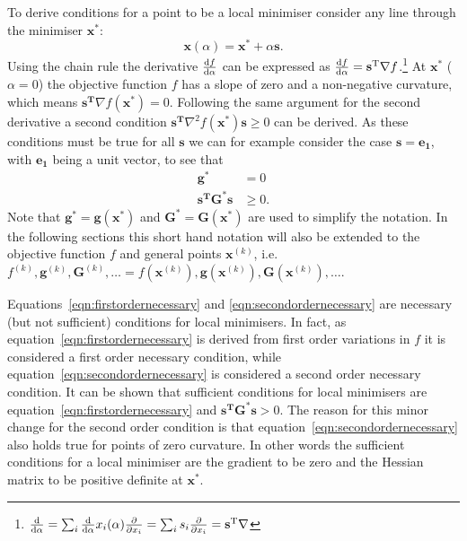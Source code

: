 To derive conditions for a point to be a local minimiser consider any line
through the minimiser $\mathbf{x^*}$:
%
\begin{equation}
    \mathbf{x}(\alpha)=\mathbf{x^*}+\alpha\mathbf{s}.
\end{equation}
%
Using the chain rule the derivative $\dv{f}{\alpha}$ can be expressed as
$\dv{f}{\alpha}=\mathbf{s^\text{T}}\nabla
f$.\footnote{$\dv{\alpha}=\sum_i\dv{\alpha}x_i(\alpha)\pdv{x_i}=\sum_i
s_i\pdv{x_i}=\mathbf{s^\text{T}}\nabla$} At $\mathbf{x^*}$ ($\alpha=0$) the
objective function $f$ has a slope of zero and a non-negative curvature, which
means $\mathbf{s^\text{T}}\nabla f(\mathbf{x^*})=0$. Following the same
argument for the second derivative a second condition
$\mathbf{s^\text{T}}\nabla^2 f(\mathbf{x^*})\mathbf{s}\geq 0$ can be derived.
As these conditions must be true for all $\mathbf{s}$ we can for example
consider the case $\mathbf{s}=\mathbf{e_1}$, with $\mathbf{e_1}$ being a unit
vector, to see that
%
\begin{align}
    \mathbf{g^*}&=0\label{eqn:firstordernecessary}\\
    \mathbf{s^\text{T}}\mathbf{G^*}\mathbf{s}&\geq 0.\label{eqn:secondordernecessary}
\end{align}
%
Note that $\mathbf{g^*}=\mathbf{g}(\mathbf{x^*})$ and
$\mathbf{G^*}=\mathbf{G}(\mathbf{x^*})$ are used to simplify the notation. In
the following sections this short hand notation will also be extended to the
objective function $f$ and general points $\mathbf{x}^{(k)}$, i.e.
$f^{(k)},\mathbf{g}^{(k)},\mathbf{G}^{(k)},\dots=f\left(\mathbf{x}^{(k)}\right),\mathbf{g}\left(\mathbf{x}^{(k)}\right),\mathbf{G}\left(\mathbf{x}^{(k)}\right),\dots$.

Equations~\eqref{eqn:firstordernecessary} and \eqref{eqn:secondordernecessary}
are necessary (but not sufficient) conditions for local minimisers. In fact, as
equation~\eqref{eqn:firstordernecessary} is derived from first order variations
in $f$ it is considered a first order necessary condition, while
equation~\eqref{eqn:secondordernecessary} is considered a second order
necessary condition. It can be shown that sufficient conditions for local
minimisers are equation~\eqref{eqn:firstordernecessary} and
$\mathbf{s^\text{T}}\mathbf{G^*}\mathbf{s}>
0$.\autocite{Fletcher_Practicalmethodsoptimization_1987} The reason for this
minor change for the second order condition is that
equation~\eqref{eqn:secondordernecessary} also holds true for points of zero
curvature. In other words the sufficient conditions for a local minimiser are
the gradient to be zero and the Hessian matrix to be positive definite at
$\mathbf{x^*}$.

